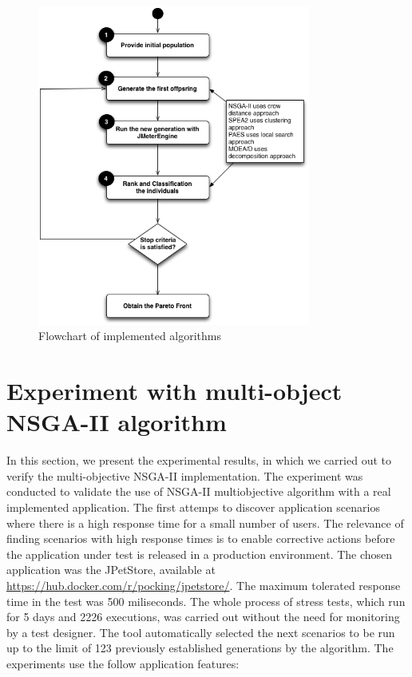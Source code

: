 \documentclass[espaco=umemeio,chapter=TITLE,twoside,openright]{abnt}
\begin{document}
\begin{figure}[!h]

\centering
\includegraphics[width=0.8\textwidth]{./images/step3.png}
\caption{Flowchart of implemented algorithms}
\label{fig:flowchart}
\end{figure}


\section{Experiment with multi-object NSGA-II algorithm}

In this section,  we present the experimental results,  in which we carried out to verify the multi-objective NSGA-II   implementation. The experiment was conducted to validate the use of NSGA-II multiobjective algorithm with a real implemented application. The first attemps to discover application scenarios where there is a high response time for a small number of users. The relevance of finding scenarios with high response times is to enable corrective actions before the application under test is released in a production environment. The chosen application was the JPetStore, available at \url{https://hub.docker.com/r/pocking/jpetstore/}. The maximum tolerated response time in the test was 500 miliseconds.  The whole process of stress  tests, which run for 5 days and 2226 executions, was carried out without the need for monitoring by a test designer. The tool automatically selected the next scenarios to be run up to the limit of 123 previously established  generations by the algorithm. The experiments use the follow application features:
\end{document}
